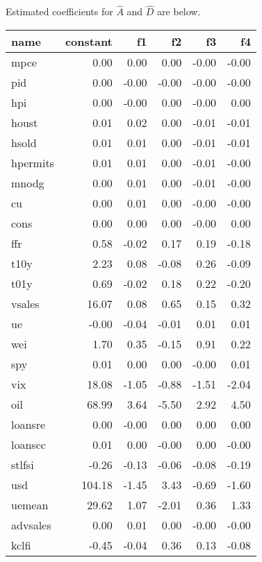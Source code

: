 \documentclass[11pt, letterpaper]{article}\usepackage[]{graphicx}\usepackage[]{color}
\begin{document}
Estimated coefficients for $\widehat{A}$ and $\widehat{D}$ are below.
\begin{table}[H]
\centering
\begingroup\footnotesize
\begin{tabular}{lrrrrr}
  \hline
name & constant & f1 & f2 & f3 & f4 \\ 
  \hline
mpce & 0.00 & 0.00 & 0.00 & -0.00 & -0.00 \\ 
  pid & 0.00 & -0.00 & -0.00 & -0.00 & -0.00 \\ 
  hpi & 0.00 & -0.00 & 0.00 & -0.00 & 0.00 \\ 
  houst & 0.01 & 0.02 & 0.00 & -0.01 & -0.01 \\ 
  hsold & 0.01 & 0.01 & 0.00 & -0.01 & -0.01 \\ 
  hpermits & 0.01 & 0.01 & 0.00 & -0.01 & -0.00 \\ 
  mnodg & 0.00 & 0.01 & 0.00 & -0.01 & -0.00 \\ 
  cu & 0.00 & 0.01 & 0.00 & -0.00 & -0.00 \\ 
  cons & 0.00 & 0.00 & 0.00 & -0.00 & 0.00 \\ 
  ffr & 0.58 & -0.02 & 0.17 & 0.19 & -0.18 \\ 
  t10y & 2.23 & 0.08 & -0.08 & 0.26 & -0.09 \\ 
  t01y & 0.69 & -0.02 & 0.18 & 0.22 & -0.20 \\ 
  vsales & 16.07 & 0.08 & 0.65 & 0.15 & 0.32 \\ 
  ue & -0.00 & -0.04 & -0.01 & 0.01 & 0.01 \\ 
  wei & 1.70 & 0.35 & -0.15 & 0.91 & 0.22 \\ 
  spy & 0.01 & 0.00 & 0.00 & -0.00 & 0.01 \\ 
  vix & 18.08 & -1.05 & -0.88 & -1.51 & -2.04 \\ 
  oil & 68.99 & 3.64 & -5.50 & 2.92 & 4.50 \\ 
  loansre & 0.00 & -0.00 & 0.00 & 0.00 & 0.00 \\ 
  loanscc & 0.01 & 0.00 & -0.00 & 0.00 & -0.00 \\ 
  stlfsi & -0.26 & -0.13 & -0.06 & -0.08 & -0.19 \\ 
  usd & 104.18 & -1.45 & 3.43 & -0.69 & -1.60 \\ 
  uemean & 29.62 & 1.07 & -2.01 & 0.36 & 1.33 \\ 
  advsales & 0.00 & 0.01 & 0.00 & -0.00 & -0.00 \\ 
  kclfi & -0.45 & -0.04 & 0.36 & 0.13 & -0.08 \\ 

\end{tabular}
\end{table}
\end{document}
